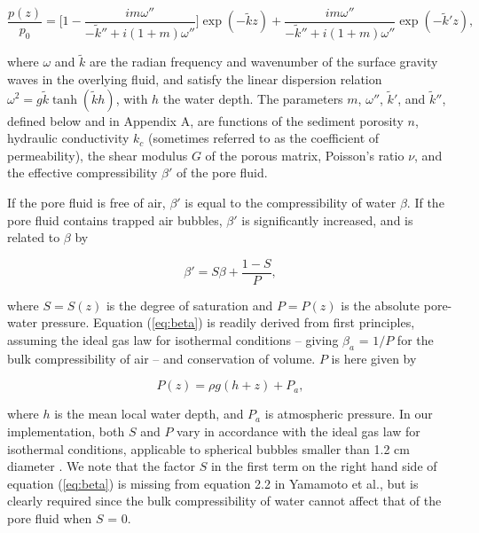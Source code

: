 
\begin{equation}
\frac{p(z)}{p_{0}} = \Big[1 - \frac{im\omega''}{-\tilde{k}'' + i(1 + m)\omega''}\Big]\exp(-\tilde{k} z) + \frac{im\omega''}{-\tilde{k}'' + i(1 + m)\omega''}\exp(-\tilde{k}' z),
\label{eq:p}
\end{equation}

\noindent where $\omega$ and $\tilde{k}$ are the radian frequency and wavenumber of the surface gravity waves in the overlying fluid, and satisfy the linear dispersion relation $\omega^2=g\tilde{k}\tanh (\tilde{k} h)$, with $h$ the water depth. The parameters $m$, $\omega''$, $\tilde{k}'$, and $\tilde{k}''$, defined below and in Appendix A, are functions of the sediment porosity $n$, hydraulic conductivity $k_{c}$ (sometimes referred to as the coefficient of permeability), the shear modulus $G$ of the porous matrix, Poisson's ratio $\nu$, and the effective compressibility $\beta'$ of the pore fluid.

If the pore fluid is free of air, $\beta'$ is equal to the compressibility of water $\beta$. If the pore fluid contains trapped air bubbles, $\beta'$ is significantly increased, and is related to $\beta$ by

\begin{equation}\label{eq:beta}
\beta' = S\beta + \frac{1-S}{P},
\end{equation}

\noindent where $S=S(z)$ is the degree of saturation and $P=P(z)$ is the absolute pore-water pressure. Equation (\ref{eq:beta}) is readily derived from first principles, assuming the ideal gas law for isothermal conditions -- giving $\beta_a$ = $1/P$ for the bulk compressibility of air -- and conservation of volume. $P$ is here given by

\begin{equation}\label{eq:abs_p}
P(z) = \rho g(h+z)+P_{a},
\end{equation}

\noindent where $h$ is the mean local water depth, and $P_{a}$ is atmospheric pressure. In our implementation, both $S$ and $P$ vary in accordance with the ideal gas law for isothermal conditions, applicable to spherical bubbles smaller than 1.2 cm diameter \citep[][ p.178]{Leighton1994}. We note that the factor $S$ in the first term on the right hand side of equation (\ref{eq:beta}) is missing from equation 2.2 in Yamamoto et al., but is clearly required since the bulk compressibility of water cannot affect that of the pore fluid when $S$ = 0.


